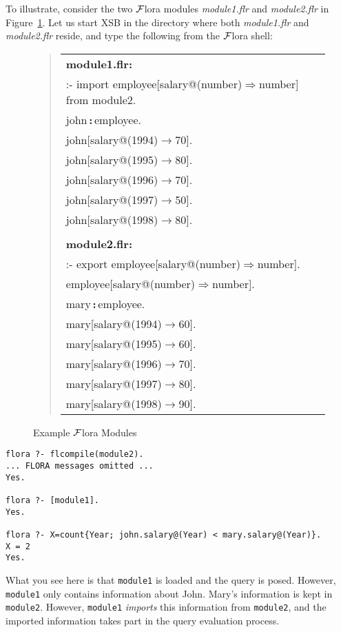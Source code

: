 \documentclass[11pt]{article}
\newcommand{\isa}{\,{\bf{:}}\,}
\newcommand{\fd}{\ensuremath{{\rightarrow}}}                   %
\newcommand{\Fd}{\ensuremath{{\Rightarrow}}}                      %
\newcommand{\FLORA}{{\mbox{${\cal F}${\sc lora}}}\xspace}
\begin{document}
To illustrate, consider the two \FLORA modules \emph{module1.flr} and
\emph{module2.flr} in Figure~\ref{fig:fig-module}.
Let us start XSB in the directory where both \emph{module1.flr} and
\emph{module2.flr} reside, and type the following from the \FLORA
shell:
\begin{figure}[htb]
\begin{quote}
\begin{tabular}{l}
{\bf module1.flr:}\vspace{3mm} \\
:- import employee[salary@(number){\Fd}number] from module2. \vspace{2mm}\\
john{\isa}employee. \\
john[salary@(1994){\fd}70]. \\
john[salary@(1995){\fd}80]. \\
john[salary@(1996){\fd}70]. \\
john[salary@(1997){\fd}50]. \\
john[salary@(1998){\fd}80]. \\
\\
{\bf module2.flr:}\vspace{3mm}
\\
:- export employee[salary@(number){\Fd}number]. \vspace{2mm}\\
employee[salary@(number){\Fd}number]. \\
mary{\isa}employee. \\
mary[salary@(1994){\fd}60]. \\
mary[salary@(1995){\fd}60]. \\
mary[salary@(1996){\fd}70]. \\
mary[salary@(1997){\fd}80]. \\
mary[salary@(1998){\fd}90].
\end{tabular}
\end{quote}
\caption{Example \FLORA Modules} \label{fig:fig-module}
\end{figure}

\begin{verbatim}
flora ?- flcompile(module2).
... FLORA messages omitted ...
Yes.

flora ?- [module1].
Yes.

flora ?- X=count{Year; john.salary@(Year) < mary.salary@(Year)}.
X = 2
Yes.
\end{verbatim}
What you see here is that {\tt module1} is loaded and the query is posed.
However, {\tt module1} only contains information about John. Mary's
information is kept in {\tt module2}. However, {\tt module1} \emph{imports}
this information from {\tt module2}, and the imported information
takes part in the query evaluation process.
\end{document}
